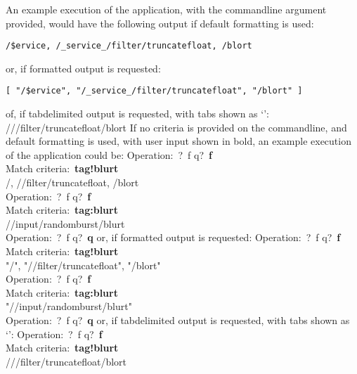 An example execution of the application, with the command\longDash{}line argument
 provided, would have the following output if default formatting is
used:
\outputBegin
\begin{verbatim}
/$ervice, /_service_/filter/truncatefloat, /blort
\end{verbatim}
\outputEnd
\condPage{}
or, if \json\longDash{}formatted output is requested:
\outputBegin
\begin{verbatim}
[ "/$ervice", "/_service_/filter/truncatefloat", "/blort" ]
\end{verbatim}
\outputEnd{}
of, if tab\longDash{}delimited output is requested, with tabs shown as `\tabSymbol':
\outputBegin{}
/\dollarService\pseudotab/\serviceName/filter/truncatefloat\pseudotab/blort
\outputEnd{}
If no criteria is provided on the command\longDash{}line, and default formatting is used,
with user input shown in bold, an example execution of the application could be:
\outputBegin{}
Operation:\ \openSq{}?\ f q\closeSq{}?\ \textbf{f}\\
Match criteria:\ \textbf{tag!blurt}\\
/\dollarService, /\serviceName/filter/truncatefloat, /blort\\
Operation:\ \openSq{}?\ f q\closeSq{}?\ \textbf{f}\\
Match criteria:\ \textbf{tag:blurt}\\
/\serviceName/input/randomburst/blurt\\
Operation:\ \openSq{}?\ f q\closeSq{}?\ \textbf{q}
\outputEnd{}
or, if \json\longDash{}formatted output is requested:
\outputBegin{}
Operation:\ \openSq{}?\ f q\closeSq{}?\ \textbf{f}\\
Match criteria:\ \textbf{tag!blurt}\\
\openSq{} "/\dollarService", "/\serviceName/filter/truncatefloat", "/blort" \closeSq\\
Operation:\ \openSq{}?\ f q\closeSq{}?\ \textbf{f}\\
Match criteria:\ \textbf{tag:blurt}\\
\openSq{} "/\serviceName/input/randomburst/blurt" \closeSq\\
Operation:\ \openSq{}?\ f q\closeSq{}?\ \textbf{q}
\outputEnd{}
or, if tab\longDash{}delimited output is requested, with tabs shown as `\tabSymbol':
\outputBegin{}
Operation:\ \openSq{}?\ f q\closeSq{}?\ \textbf{f}\\
Match criteria:\ \textbf{tag!blurt}\\
/\dollarService\pseudotab/\serviceName/filter/truncatefloat\pseudotab/blort\\
